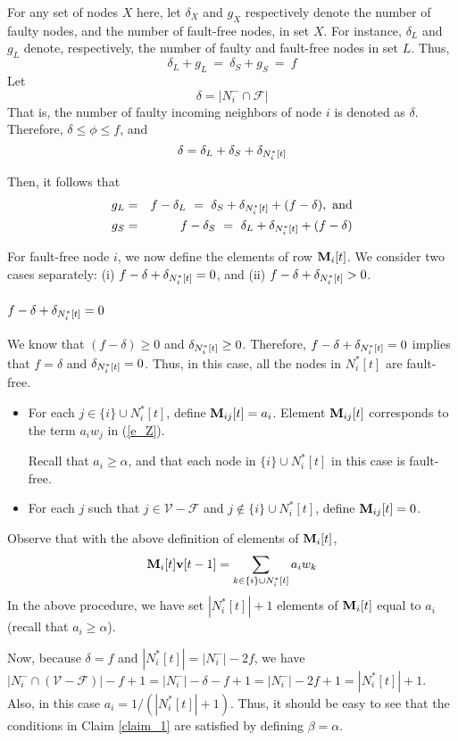 \documentclass[letterpaper, 12pt]{article}
\newcommand{\scriptf}{\mathcal{F}}
\newcommand{\scriptv}{\mathcal{V}}
\begin{document}
For any set of nodes $X$ here, let $\delta_X$ and $g_X$ respectively
denote the number of faulty nodes, and the number of fault-free nodes, in set $X$.
For instance, $\delta_L$ and $g_L$ denote, respectively, the number
of faulty and fault-free nodes in set $L$.
Thus,
\[ \delta_L+g_L~=~\delta_S+g_S~=~f\]
Let
\[
\delta = |N_i^-\cap \scriptf|
\]
That is, the number of faulty incoming neighbors of node $i$ is denoted
as $\delta$.
Therefore, $\delta\leq\phi\leq f$,
and
\[
\delta = \delta_L+\delta_S+\delta_{N_i^*[t]}
\]



Then, it follows that
\begin{eqnarray}
g_L & = & f-\delta_L ~= ~ \delta_S+\delta_{N_i^*[t]}+(f-\delta), \mbox{~and}  \label{g_L}\\
g_S & = & f-\delta_S~=~\delta_L+\delta_{N_i^*[t]}+(f-\delta) \label{g_S}
\end{eqnarray}


For fault-free node $i$,
we now define the elements of row ${\bf M}_i[t]$.
We consider two cases separately: (i) $f-\delta+\delta_{N_i^*[t]}=0$,
and (ii) $f-\delta+\delta_{N_i^*[t]}>0$. 

\subsubsection{$f-\delta+\delta_{N_i^*[t]}=0$}
\label{ss_1}

We know that $(f-\delta) \geq 0$ and $\delta_{N_i^*[t]}\geq 0$.
Therefore, $f-\delta+\delta_{N_i^*[t]}=0$ implies that $f=\delta$
and $\delta_{N_i^*[t]}=0$. Thus, in this case, all the nodes in $N_i^*[t]$
are fault-free.
\begin{itemize}
\item
For each 
$j \in \{i\}\cup N_i^*[t]$, define ${\bf M}_{ij}[t] = a_i$.
Element ${\bf M}_{ij}[t]$ corresponds to the term $a_iw_j$ in (\ref{e_Z}).

Recall that $a_i\geq \alpha$, and that each node in $\{i\}\cup N_i^*[t]$
in this case is fault-free.

\item 
For each $j$ such that $j\in\scriptv-\scriptf$
and $j\not\in \{i\}\cup N_i^*[t]$, define ${\bf M}_{ij}[t] = 0$.
\end{itemize}
Observe that with the above definition of elements of ${\bf M}_i[t]$,
\[ {\bf M}_i[t] {\bf v}[t-1] = \sum_{k\in \{i\}\cup N_i^*[t]} a_iw_k
\]
In the above procedure, we have set $|N_i^*[t]|+1$ elements of ${\bf M}_i[t]$
equal to $a_i$ (recall that $a_i\geq \alpha$).

Now, because $\delta=f$ and $|N_i^*[t]|=|N_i^-|-2f$, we have
$|N_i^-\cap(\scriptv-\scriptf)|-f+1=|N_i^-|-\delta-f+1
= |N_i^-|-2f+1 = |N_i^*[t]|+1$.
Also, in this case $a_i=1/(|N_i^*[t]|+1)$. Thus, it should
be easy to see that the conditions in Claim \ref{claim_1} are satisfied
by defining $\beta=\alpha$.
\end{document}
